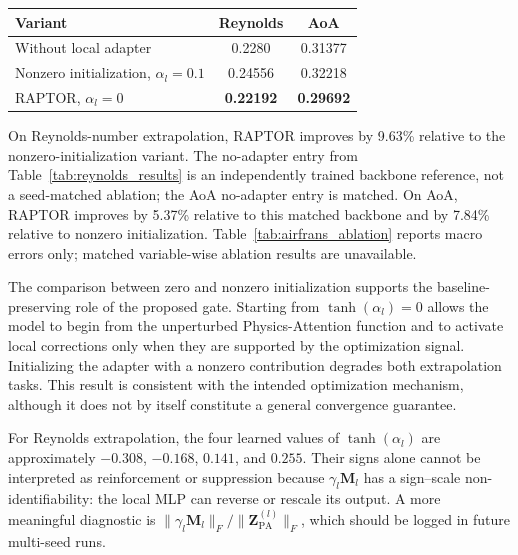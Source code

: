 \documentclass[a4paper,fleqn]{cas-sc}
\begin{document}
\begin{center}
    \begin{minipage}{0.76\linewidth}
        \centering
	\label{tab:airfrans_ablation}
	\begin{tabular}{lcc}
		\toprule
		Variant & Reynolds & AoA \\
		\midrule
		Without local adapter
		& 0.2280
		& 0.31377 \\
		Nonzero initialization, $\alpha_l=0.1$
		& 0.24556
		& 0.32218 \\
		RAPTOR, $\alpha_l=0$
		& \textbf{0.22192}
		& \textbf{0.29692} \\
		\bottomrule
	\end{tabular}
    \end{minipage}
\end{center}


On Reynolds-number extrapolation, RAPTOR improves by 9.63\% relative to the
nonzero-initialization variant. The no-adapter entry from
Table~\ref{tab:reynolds_results} is an independently trained backbone
reference, not a seed-matched ablation; the AoA no-adapter entry is matched.
On AoA, RAPTOR improves by 5.37\% relative to this matched backbone and
by 7.84\% relative to nonzero initialization. Table~\ref{tab:airfrans_ablation}
reports macro errors only; matched variable-wise ablation results are
unavailable.

The comparison between zero and nonzero initialization supports the
baseline-preserving role of the proposed gate. Starting from
\(\tanh(\alpha_l)=0\) allows the model to begin from the unperturbed
Physics-Attention function and to activate local corrections only when they
are supported by the optimization signal. Initializing the adapter with a
nonzero contribution degrades both extrapolation tasks. This result is
consistent with the intended optimization mechanism, although it does not
by itself constitute a general convergence guarantee.

For Reynolds extrapolation, the four learned values of
\(\tanh(\alpha_l)\) are approximately \(-0.308\), \(-0.168\), \(0.141\),
and \(0.255\). Their signs alone cannot be interpreted as reinforcement or
suppression because \(\gamma_l\mathbf M_l\) has a sign--scale
non-identifiability: the local MLP can reverse or rescale its output. A more
meaningful diagnostic is
\(\|\gamma_l\mathbf M_l\|_F/\|\mathbf Z_{\mathrm{PA}}^{(l)}\|_F\), which
should be logged in future multi-seed runs.
\end{document}
